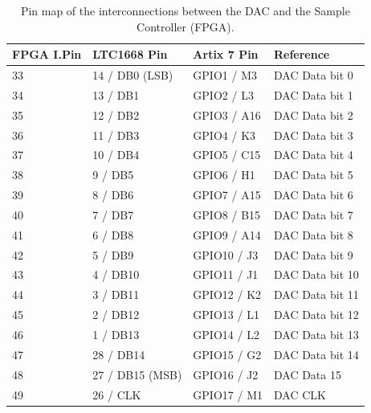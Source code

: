 \begin{table}[H]
    \begin{tabular}{|m{5.2em}|m{8em}|m{8em}|m{8em}|}
    \hline
    \textbf{FPGA I.Pin} &   \textbf{LTC1668 Pin} & \textbf{Artix 7 Pin} & \textbf{Reference}  \\ \hline
    33 & 14 / DB0 (LSB) & GPIO1 / M3 & DAC Data bit 0 \\ \hline
    34 & 13 / DB1 & GPIO2 / L3 & DAC Data bit 1 \\ \hline
    35 & 12 / DB2 & GPIO3 / A16 & DAC Data bit 2 \\ \hline
    36 & 11 / DB3 & GPIO4 / K3 & DAC Data bit 3 \\\hline
    37 & 10 / DB4 & GPIO5 / C15 & DAC Data bit 4 \\ \hline
    38 & 9 / DB5 & GPIO6 / H1 & DAC Data bit 5 \\ \hline
    39 & 8 / DB6 & GPIO7 / A15 & DAC Data bit 6 \\ \hline
    40 & 7 / DB7 & GPIO8 / B15 & DAC Data bit 7 \\ \hline
    41 & 6 / DB8 & GPIO9 / A14 & DAC Data bit 8 \\ \hline
    42 & 5 / DB9 & GPIO10 / J3 & DAC Data bit 9 \\ \hline
    43 & 4 / DB10 & GPIO11 / J1 & DAC Data bit 10 \\ \hline
    44 & 3 / DB11 & GPIO12 / K2 & DAC Data bit 11 \\ \hline
    45 & 2 / DB12 & GPIO13 / L1 & DAC Data bit 12 \\ \hline
    46 & 1 / DB13 & GPIO14 / L2 & DAC Data bit 13 \\ \hline
    47 & 28 / DB14 & GPIO15 / G2 & DAC Data bit 14 \\ \hline
    48 & 27 / DB15 (MSB) & GPIO16 / J2 & DAC Data 15 \\ \hline
    49 & 26 / CLK & GPIO17 / M1 & DAC CLK \\ \hline
 
    \end{tabular}
    \caption{Pin map of the interconnections between the DAC and the Sample Controller (FPGA).}
    \label{tab:App_FPGA_DAC_PinMap}
  \end{table}